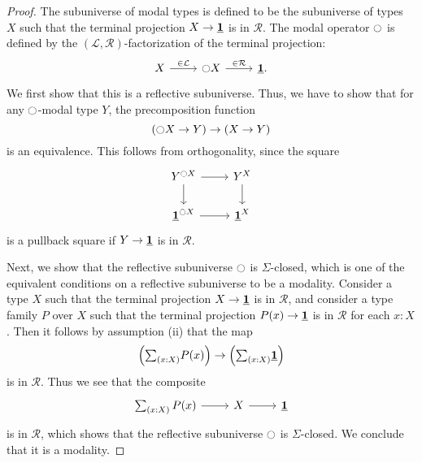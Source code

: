 \documentclass[9pt,twosided]{amsart}
\begin{document}
\begin{proof}
  The subuniverse of modal types is defined to be the subuniverse of types $X$ such that the terminal projection $X\to \underline{\mathbf{1}}$ is in $\mathcal{R}$. The modal operator ${\ocircle}$ is defined by the $(\mathcal{L},\mathcal{R})$-factorization of the terminal projection:
  \begin{equation*}
    \begin{tikzcd}
      X \arrow[r,"\in\mathcal{L}"] & \modal X \arrow[r,"\in\mathcal{R}"] & \unit.
    \end{tikzcd}
  \end{equation*}
  We first show that this is a reflective subuniverse. Thus, we have to show that for any ${\ocircle}$-modal type $Y$, the precomposition function
  \begin{equation*}
    ({\ocircle} X\to Y)\to (X\to Y)
  \end{equation*}
  is an equivalence. This follows from orthogonality, since the square
  \begin{equation*}
    \begin{tikzcd}
      Y^{\modal X} \arrow[r] \arrow[d] & Y^X \arrow[d] \\
      \unit^{\modal X} \arrow[r] & \unit^X
    \end{tikzcd}
  \end{equation*}
  is a pullback square if $Y\to\underline{\mathbf{1}}$ is in $\mathcal{R}$.

  Next, we show that the reflective subuniverse ${\ocircle}$ is $\Sigma$-closed, which is one of the equivalent conditions on a reflective subuniverse to be a modality. Consider a type $X$ such that the terminal projection $X\to\underline{\mathbf{1}}$ is in $\mathcal{R}$, and consider a type family $P$ over $X$ such that the terminal projection $P(x) \to \underline{\mathbf{1}}$ is in $\mathcal{R}$ for each $x:X$. Then it follows by assumption (ii) that the map
  \begin{equation*}
    \Big(\sm{x:X}P(x)\Big)\to\Big(\sm{x:X}\unit\Big)
  \end{equation*}
  is in $\mathcal{R}$. Thus we see that the composite
  \begin{equation*}
    \begin{tikzcd}
      \sm{x:X}P(x) \arrow[r] & X \arrow[r] & \unit
    \end{tikzcd}
  \end{equation*}
  is in $\mathcal{R}$, which shows that the reflective subuniverse ${\ocircle}$ is $\Sigma$-closed. We conclude that it is a modality.


\end{proof}
\end{document}
